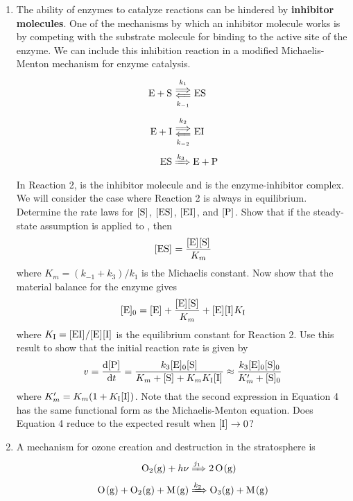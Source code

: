\documentclass[../psets.tex]{subfiles}
\begin{document}
\begin{enumerate}[label={\textbf{29-\arabic*.}},leftmargin=3.5em]
    \item The ability of enzymes to catalyze reactions can be hindered by \textbf{inhibitor molecules}. One of the mechanisms by which an inhibitor molecule works is by competing with the substrate molecule for binding to the active site of the enzyme. We can include this inhibition reaction in a modified Michaelis-Menton mechanism for enzyme catalysis.
    \begin{align}
        \ce{E + S} &\Longleftrightarrows[k_1][k_{-1}] \ce{ES}\\
        \ce{E + I} &\Longleftrightarrows[k_2][k_{-2}] \ce{EI}\\
        \ce{ES} &\xRightarrow{k_3} \ce{E + P}
    \end{align}
    In Reaction 2,  is the inhibitor molecule and  is the enzyme-inhibitor complex. We will consider the case where Reaction 2 is always in equilibrium. Determine the rate laws for $\cnc{S}$, $\cnc{ES}$, $\cnc{EI}$, and $\cnc{P}$. Show that if the steady-state assumption is applied to , then
    \begin{equation*}
        \cnc{ES} = \frac{\cnc{E}\cnc{S}}{K_m}
    \end{equation*}
    where $K_m=(k_{-1}+k_3)/k_1$ is the Michaelis constant. Now show that the material balance for the enzyme gives
    \begin{equation*}
        \cnc[0]{E} = \cnc{E}+\frac{\cnc{E}\cnc{S}}{K_m}+\cnc{E}\cnc{I}K_{\ce{I}}
    \end{equation*}
    where $K_{\ce{I}}=\cnc{EI}/\cnc{E}\cnc{I}$ is the equilibrium constant for Reaction 2. Use this result to show that the initial reaction rate is given by
    \begin{equation}
        v = \dv{\cnc{P}}{t}
        = \frac{k_3\cnc[0]{E}\cnc{S}}{K_m+\cnc{S}+K_mK_{\ce{I}}\cnc{I}}
        \approx \frac{k_3\cnc[0]{E}\cnc[0]{S}}{K_m'+\cnc[0]{S}}
    \end{equation}
    where $K_m'=K_m(1+K_{\ce{I}}\cnc{I})$. Note that the second expression in Equation 4 has the same functional form as the Michaelis-Menton equation. Does Equation 4 reduce to the expected result when $\cnc{I}\to 0$?
    \setcounter{equation}{0}
    \setcounter{enumi}{46}
    \item A mechanism for ozone creation and destruction in the stratosphere is
    \begin{align*}
        \ce{O2(g) + $h\nu$} &\xRightarrow{j_1} \ce{2O(g)}\\
        \ce{O(g) + O2(g) + M(g)} &\xRightarrow{k_2} \ce{O3(g) + M(g)}\\

\end{align*}
\end{enumerate}
\end{document}
